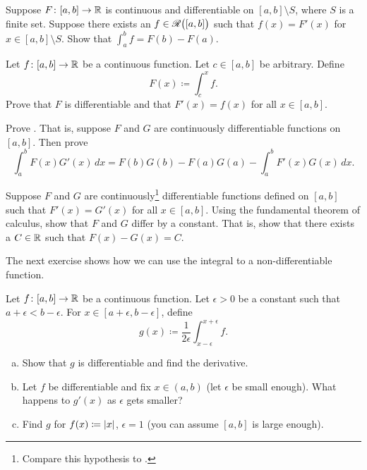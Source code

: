 \begin{exercise}
Suppose $F \colon [a,b] \to {\mathbb{R}}$ is continuous and differentiable
on $[a,b] \setminus S$, where $S$ is a finite set.  Suppose there
exists an $f \in {\mathscr{R}}\bigl([a,b]\bigr)$ such that $f(x) = F'(x)$ for $x \in [a,b]
\setminus S$.  Show that
$\int_a^b f = F(b)-F(a)$.
\end{exercise}

\begin{exercise} \label{secondftc:exercise}
Let $f \colon [a,b] \to {\mathbb{R}}$ be a continuous function.  Let $c \in [a,b]$
be arbitrary.  Define
\begin{equation*}
F(x) \coloneqq \int_c^x f .
\end{equation*}
Prove that $F$ is differentiable and that $F'(x) = f(x)$ for all $x \in
[a,b]$.
\end{exercise}

\begin{exercise}
Prove \emph{}.  That is, suppose $F$ and
$G$ are continuously differentiable functions on $[a,b]$.  Then prove
\begin{equation*}
\int_a^b F(x)G'(x)\,dx
=
F(b)G(b)-F(a)G(a)
-
\int_a^b F'(x)G(x)\,dx .
\end{equation*}
\end{exercise}

\begin{exercise}
Suppose $F$ and $G$ are
continuously\footnote{
Compare this hypothesis to .}
differentiable
functions defined on $[a,b]$
such that $F'(x) = G'(x)$ for all $x \in [a,b]$.
Using the fundamental theorem of calculus,
show that $F$ and $G$ differ by a constant.  That is, show that
there exists a $C \in {\mathbb{R}}$ such that
$F(x)-G(x) = C$.
\end{exercise}

\begin{exnote}
The next exercise shows how we can use the integral to  a
non-differentiable function.
\end{exnote}

\begin{exercise} \label{exercise:smoothingout}
Let $f \colon [a,b] \to {\mathbb{R}}$ be a continuous function.  Let $\epsilon > 0$
be a constant such that $a+\epsilon < b-\epsilon$.  For $x \in [a+\epsilon,b-\epsilon]$, define
\begin{equation*}
g(x) \coloneqq \frac{1}{2\epsilon} \int_{x-\epsilon}^{x+\epsilon} f .
\end{equation*}
\begin{enumerate}[a)]
\item
Show that $g$ is differentiable and find the derivative.
\item
Let $f$ be differentiable and fix $x \in (a,b)$ (let $\epsilon$
be small enough).  What happens to $g'(x)$ as $\epsilon$ gets smaller?
\item
Find $g$ for $f(x) \coloneqq \lvert {x} \rvert$, $\epsilon = 1$ (you can assume 
$[a,b]$ is large enough).
\end{enumerate}
\end{exercise}

